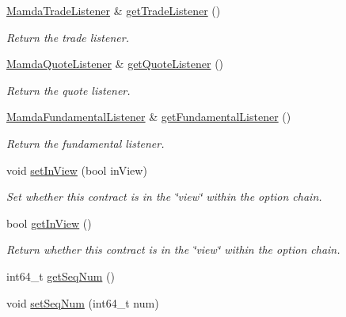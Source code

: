 \begin{CompactItemize}
\hyperlink{classWombat_1_1MamdaTradeListener}{Mamda\-Trade\-Listener} \& \hyperlink{classWombat_1_1MamdaOptionContract_f6640ac35d15df14e4b044597f4bf7d0}{get\-Trade\-Listener} ()
\begin{CompactList}\small\item\em Return the trade listener. \item\end{CompactList}\item 
\hyperlink{classWombat_1_1MamdaQuoteListener}{Mamda\-Quote\-Listener} \& \hyperlink{classWombat_1_1MamdaOptionContract_956e06dfe57a24b8bfff64fbe6e8e111}{get\-Quote\-Listener} ()
\begin{CompactList}\small\item\em Return the quote listener. \item\end{CompactList}\item 
\hyperlink{classWombat_1_1MamdaFundamentalListener}{Mamda\-Fundamental\-Listener} \& \hyperlink{classWombat_1_1MamdaOptionContract_f5397ed9eaea7471258ccdbdd85fc000}{get\-Fundamental\-Listener} ()
\begin{CompactList}\small\item\em Return the fundamental listener. \item\end{CompactList}\item 
void \hyperlink{classWombat_1_1MamdaOptionContract_1ce396440ba8edcee5bdb72ba372ba85}{set\-In\-View} (bool in\-View)
\begin{CompactList}\small\item\em Set whether this contract is in the \char`\"{}view\char`\"{} within the option chain. \item\end{CompactList}\item 
bool \hyperlink{classWombat_1_1MamdaOptionContract_b78e238a6970d75cec187b236d693f16}{get\-In\-View} ()
\begin{CompactList}\small\item\em Return whether this contract is in the \char`\"{}view\char`\"{} within the option chain. \item\end{CompactList}\item 
int64\_\-t \hyperlink{classWombat_1_1MamdaOptionContract_dc8dfd209bc57a9b248180bcba1dccf3}{get\-Seq\-Num} ()
\item 
void \hyperlink{classWombat_1_1MamdaOptionContract_b3fb00be49aa058bd98b12d21a535f9e}{set\-Seq\-Num} (int64\_\-t num)
\end{CompactItemize}


